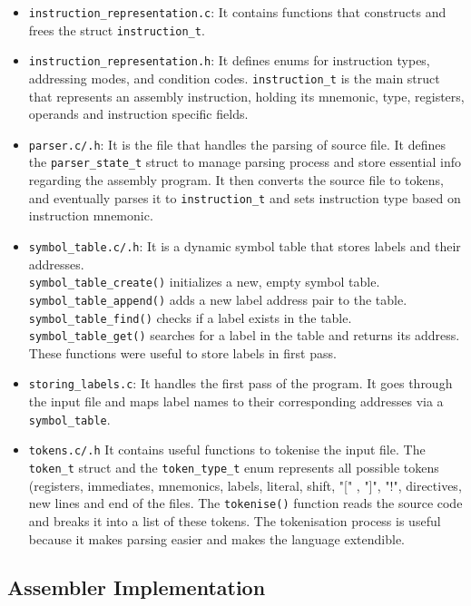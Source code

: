 \documentclass{article}
\begin{document}
\begin{itemize}
\item \verb|instruction_representation.c|: It contains functions that constructs and frees the struct \verb|instruction_t|. 

\item \verb|instruction_representation.h|: It defines enums for instruction types, addressing modes, and condition codes. \verb|instruction_t| is the main struct that represents an assembly instruction, holding its mnemonic, type, registers, operands and instruction specific fields. 

 \item \verb|parser.c/.h|: It is the file that handles the parsing of source file. It defines the \verb|parser_state_t| struct to manage parsing process and store essential info regarding the assembly program. It then converts the source file to tokens, and eventually parses it to \verb|instruction_t| and sets instruction type based on instruction mnemonic.

\item \verb|symbol_table.c/.h|: It is a dynamic symbol table that stores labels and their addresses. \\ \verb|symbol_table_create()| initializes a new, empty symbol table. \verb|symbol_table_append()| adds a new label address pair to the table. \verb|symbol_table_find()| checks if a label exists in the table. \verb|symbol_table_get()| searches for a label in the table and returns its address. These functions were useful to store labels in first pass.
    
\item \verb|storing_labels.c|: It handles the first pass of the program. It goes through the input file and maps label names to their corresponding addresses via a \verb|symbol_table|.

\item \verb|tokens.c/.h| It contains useful functions to tokenise the input file. The \verb|token_t| struct and the \verb|token_type_t| enum  represents all possible tokens (registers, immediates, mnemonics, labels, literal, shift, "[" , "]", "!",  directives, new lines and end of the files. The \verb|tokenise()| function reads the source code and breaks it into a list of these tokens. The tokenisation process is useful because it makes parsing easier and makes the language extendible.
\end{itemize}



\subsection{Assembler Implementation}
\end{document}

